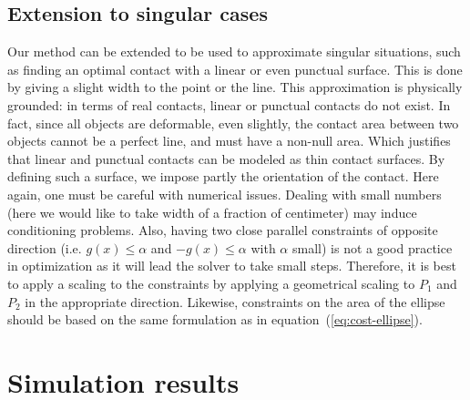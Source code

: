 \subsection{Extension to singular cases}
\label{subsec:singular cases}
Our method can be extended to be used to approximate singular situations, such as finding an optimal contact with a linear or even punctual surface. This is done by giving a slight width to the point or the line. This approximation is physically grounded:
in terms of real contacts, linear or punctual contacts do not exist. In fact, since all objects are deformable, even slightly, the contact area between two objects cannot be a perfect line, and must have a non-null area. Which justifies that linear and punctual contacts can be modeled as thin contact surfaces. By defining such a surface, we impose partly the orientation of the contact.
Here again, one must be careful with numerical issues. Dealing with small numbers (here we would like to take width of a fraction of centimeter) may induce conditioning problems. Also, having two close parallel constraints of opposite direction (i.e. $g(x)\leq \alpha$ and  $-g(x)\leq \alpha$ with $\alpha$ small) is not a good practice in optimization as it will lead the solver to take small steps. Therefore, it is best to apply a scaling to the constraints by applying a geometrical scaling to $P_1$ and $P_2$ in the appropriate direction.\newline
Likewise, constraints on the area of the ellipse should be based on the same formulation as in equation~(\ref{eq:cost-ellipse}).

\section{Simulation results}
\label{sec:simu}

